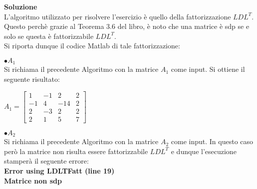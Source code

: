 \large\noindent{}
\begin{flushleft}
	\large \textbf{Soluzione}\\[0.5cm]
	L'algoritmo utilizzato per risolvere l'esercizio è quello della fattorizzazione $LDL^{T}$. Questo perchè grazie al Teorema 3.6 del libro, è noto che una matrice è sdp se e solo se questa è fattorizzabile $LDL^{T}$.\\Si riporta dunque il codice Matlab di tale fattorizzazione:
	
	$\bullet A_{1}$\\[0.3cm]
	Si richiama il precedente Algoritmo con la matrice $A_{1}$ come input. Si ottiene il seguente risultato:
	\begin{center}
		$A_{1} = \begin{bmatrix}
				1 & -1 & 2 & 2\\
				-1 & 4 & -14 & 2\\
				2 & -3 & 2 & 2\\
				2 & 1 & 5 & 7
			\end{bmatrix}$
		\end{center}
		\newpage
		$\bullet A_{2}$\\[0.3cm]
	Si richiama il precedente Algoritmo con la matrice $A_{2}$ come input. In questo caso però la matrice non risulta essere fattorizzabile $LDL^{T}$ e dunque l'esecuzione stamperà il seguente errore:\\[0.4cm]
		\textbf{Error using LDLTFatt (line 19)}\\	
		\textbf{Matrice non sdp}\\
	\end{flushleft}